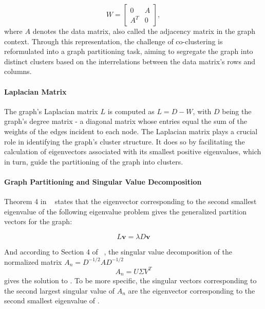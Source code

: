 \documentclass[journal]{IEEEtran}
\renewcommand{\cite}[1]{~\autocite{#1}}
\begin{document}
$$ W = \begin{bmatrix} 0 & A \\ A^T & 0 \end{bmatrix}, $$
where $A$ denotes the data matrix, also called the adjacency matrix in the graph context.
Through this representation, the challenge of co-clustering is reformulated into a graph partitioning task, aiming to segregate the graph into distinct clusters based on the interrelations between the data matrix's rows and columns.

\paragraph{Laplacian Matrix}

The graph's Laplacian matrix $L$ is computed as $L=D-W$, with $D$ being the graph's degree matrix - a diagonal matrix whose entries equal the sum of the weights of the edges incident to each node. The Laplacian matrix plays a crucial role in identifying the graph's cluster structure. It does so by facilitating the calculation of eigenvectors associated with its smallest positive eigenvalues, which in turn, guide the partitioning of the graph into clusters.

\paragraph{Graph Partitioning and Singular Value Decomposition}

Theorem 4 in \cite{dhillon2001CoclusteringDocumentsWords} states that the eigenvector corresponding to the second smallest eigenvalue of the following eigenvalue problem gives the generalized partition vectors for the graph:

\begin{equation}
  L \mathbf{v} = \lambda D \mathbf{v}
  \label{eq:eigenvalue_problem}
\end{equation}

And according to Section 4 of \cite{dhillon2001CoclusteringDocumentsWords}, the singular value decomposition of the normalized matrix $A_n = D^{-1/2} A D^{-1/2}$
$$A_n = U \Sigma V^T$$
gives the solution to . To be more specific, the singular vectors corresponding to the second largest singular value of $A_n$ are the eigenvector corresponding to the second smallest eigenvalue of .
\end{document}
